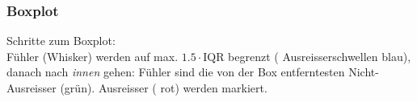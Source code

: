 \begin{multicols}{2}

\end{multicols}


\newpage
\subsubsection*{Boxplot}
Schritte zum Boxplot:\\
Fühler (Whisker) werden auf max. $1.5\cdot\textrm{IQR}$ begrenzt ({\color{blue} Ausreisserschwellen blau}),
danach nach \textit{\color{FarnFarbe}innen} gehen: Fühler sind die von der Box
entferntesten Nicht-Ausreisser ({\color{FarnFarbe}grün}). Ausreisser
({\color{red} rot}) werden markiert.

\hrulefill

